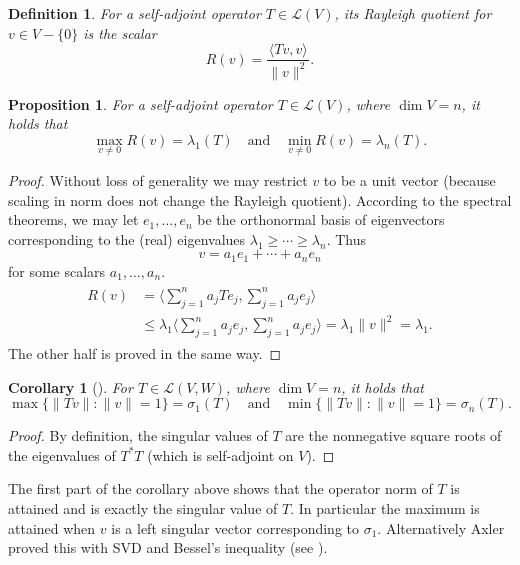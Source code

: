 \documentclass[11pt]{article}
\numberwithin{equation}{section}
\theoremstyle{plain-star}
\newtheorem{prop}[equation]{Proposition}
\newtheorem{cor}[equation]{Corollary}
\theoremstyle{definition-star}
\newtheorem{defn}[equation]{Definition}
\theoremstyle{remark-star}
\theoremstyle{plain-star}
\newcommand{\la}{\langle}
\newcommand{\ra}{\rangle}
\newcommand{\inp}[2]{\langle #1, #2 \rangle}
\newcommand{\nm}[1]{\lVert #1 \rVert}
\newcommand{\LV}{\mathcal{L}(V)}
\newcommand{\LVW}{\mathcal{L}(V,W)}
\newcommand{\df}[1]{\textit{#1}}
\begin{document}
\begin{defn}
    For a self-adjoint operator $T \in \LV$, its \df{Rayleigh quotient} for $v \in V - \{0\}$ is the scalar \[R(v) = \frac{\inp{Tv}{v}}{\nm{v}^2}.\]
\end{defn}

\begin{prop}\label{prop:rayleigh-eigen}
    For a self-adjoint operator $T \in \LV$, where $\dim V = n$, it holds that \[
        \max_{v \neq 0} R(v) = \lambda_1(T)\quad \text{and} \quad \min_{v \neq 0} R(v) = \lambda_n(T).
    \]
\end{prop}

\begin{proof}
    Without loss of generality we may restrict $v$ to be a unit vector (because scaling in norm does not change the Rayleigh quotient). According to the spectral theorems, we may let $e_1,\dotsc,e_n$ be the orthonormal basis of eigenvectors corresponding to the (real) eigenvalues $\lambda_1\geq\dotsb\geq\lambda_n$. Thus \[
        v = a_1 e_1 + \dotsb + a_n e_n
    \] for some scalars $a_1,\dotsc,a_n$. 
    \begin{align} \begin{split} \label{eq:rayleigh-expansion}
        R(v) & = \biggl\la \sum_{j=1}^n a_jTe_j,\sum_{j=1}^n a_je_j\biggr\ra \\
        & \leq \lambda_1 \biggl\la \sum_{j=1}^n a_je_j, \sum_{j=1}^n a_je_j\biggr\ra = \lambda_1 \nm{v}^2 = \lambda_1. \end{split}
    \end{align} 
    The other half is proved in the same way.
\end{proof}

\begin{cor}[{\cite[Exercise~7E.4]{axler2024}}]\label{cor:rayleigh-sing}
    For $T \in \LVW$, where $\dim V = n$, it holds that \[
        \max\{\nm{Tv}:\nm{v} = 1\} = \sigma_1(T)\quad \text{and}\quad \min\{\nm{Tv}:\nm{v} = 1\} = \sigma_n(T).
    \]
\end{cor}
\begin{proof}
    By definition, the singular values of $T$ are the nonnegative square roots of the eigenvalues of $T^*T$ (which is self-adjoint on $V$).
\end{proof}
The first part of the corollary above shows that the operator norm of $T$ is attained and is exactly the singular value of $T$. In particular the maximum is attained when $v$ is a left singular vector corresponding to $\sigma_1$. Alternatively Axler proved this with SVD and Bessel's inequality (see \cite[Section 7F]{axler2024}).
\end{document}
